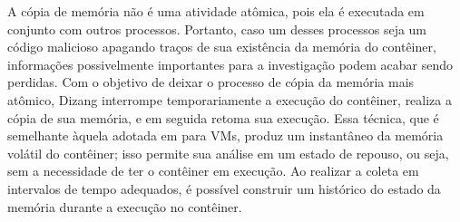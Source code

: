 \documentclass[conference]{IEEEtran}
\newcommand{\marcosT}[1]{{\color{red}{TODO: #1}}}
\newcommand{\fancyname}{Dizang }
\begin{document}
A cópia de memória não é uma atividade atômica, pois ela é executada em conjunto com outros processos. 
%
Portanto, caso um desses processos seja um código malicioso apagando traços de sua existência da memória do contêiner, informações possivelmente importantes para a investigação podem acabar sendo perdidas. 
%
Com o objetivo de deixar o processo de cópia da memória mais atômico, \fancyname interrompe temporariamente a execução do contêiner, realiza a cópia de sua memória, e em seguida retoma sua execução. 
%
Essa técnica, que é semelhante àquela adotada em \cite{Rafique_Static_Live_Digital_Forensics:2013} para VMs, produz um instantâneo da memória volátil do contêiner; isso permite sua análise em um estado de repouso, ou seja, sem a necessidade de ter o contêiner em execução.
%
Ao realizar a coleta em intervalos de tempo adequados, é possível construir um histórico do estado da memória durante a execução no contêiner.
%
\end{document}
